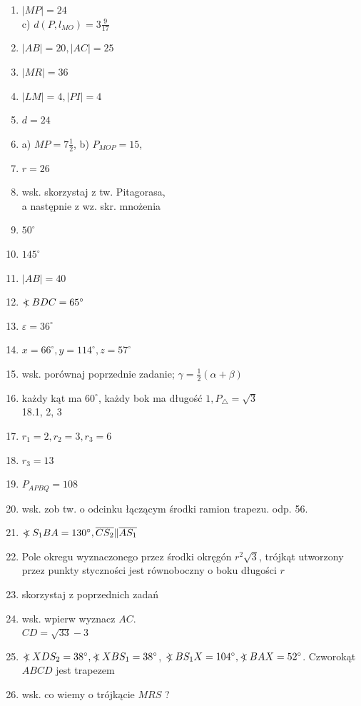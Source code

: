 \documentclass[10pt]{article}
\newcommand\Varangle{\mathop{{<\!\!\!\!\!\text{\small)}}\:}\nolimits}
\begin{document}
\begin{enumerate}
  \item \(|M P|=24\)\\
c) \(d\left(P, l_{M O}\right)=3 \frac{9}{17}\)
  \item \(|A B|=20,|A C|=25\)
  \item \(|M R|=36\)
  \item \(|L M|=4,|P I|=4\)
  \item \(d=24\)
  \item a) \(M P=7 \frac{1}{2}\), b) \(P_{M O P}=15\),
  \item \(r=26\)
  \item wsk. skorzystaj z tw. Pitagorasa,\\
a następnie z wz. skr. mnożenia
  \item \(50^{\circ}\)
  \item \(145^{\circ}\)
  \item \(|A B|=40\)
  \item \(\Varangle B D C=65^{\circ}\)
  \item \(\varepsilon=36^{\circ}\)
  \item \(x=66^{\circ}, y=114^{\circ}, z=57^{\circ}\)
  \item wsk. porównaj poprzednie zadanie; \(\gamma=\frac{1}{2}(\alpha+\beta)\)
  \item każdy kąt ma \(60^{\circ}\), każdy bok ma długość \(1, P_{\triangle}=\sqrt{3}\)\\
18.1, 2, 3
  \item \(r_{1}=2, r_{2}=3, r_{3}=6\)
  \item \(r_{3}=13\)
  \item \(P_{A P B Q}=108\)
  \item wsk. zob tw. o odcinku łączącym środki ramion trapezu. odp. 56.
  \item \(\Varangle S_{1} B A=130^{\circ}, \overline{C S_{2}} \| \overline{A S_{1}}\)
  \item Pole okregu wyznaczonego przez środki okręgón \(r^{2} \sqrt{3}\), trójkąt utworzony przez punkty styczności jest równoboczny o boku długości \(r\)
  \item skorzystaj z poprzednich zadań
  \item wsk. wpierw wyznacz \(A C\).\\
\(C D=\sqrt{33}-3\)
  \item \(\Varangle X D S_{2}=38^{\circ}, \Varangle X B S_{1}=38^{\circ}\), \(\Varangle B S_{1} X=104^{\circ}, \Varangle B A X=52^{\circ}\). Czworokąt \(A B C D\) jest trapezem
  \item wsk. co wiemy o trójkącie \(M R S\) ?

\end{enumerate}
\end{document}
